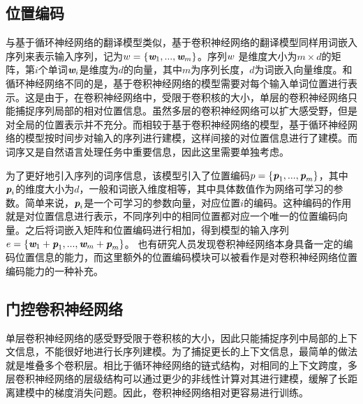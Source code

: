 
\subsection{位置编码}
\label{sec:11.2.1}

\parinterval 与基于循环神经网络的翻译模型类似，基于卷积神经网络的翻译模型同样用词嵌入序列来表示输入序列，记为${w}=\{\textbf{\em w}_1,...,\textbf{\em w}_m\}$。序列${w}$ 是维度大小为$m \times d$的矩阵，第$i$个单词$\textbf{\em w}_i$是维度为$d$的向量，其中$m$为序列长度，$d$为词嵌入向量维度。和循环神经网络不同的是，基于卷积神经网络的模型需要对每个输入单词位置进行表示。这是由于，在卷积神经网络中，受限于卷积核的大小，单层的卷积神经网络只能捕捉序列局部的相对位置信息。虽然多层的卷积神经网络可以扩大感受野，但是对全局的位置表示并不充分。而相较于基于卷积神经网络的模型，基于循环神经网络的模型按时间步对输入的序列进行建模，这样间接的对位置信息进行了建模。而词序又是自然语言处理任务中重要信息，因此这里需要单独考虑。

\parinterval 为了更好地引入序列的词序信息，该模型引入了位置编码${p}=\{\textbf{\em p}_1,...,\textbf{\em p}_m\}$，其中$\textbf{\em p}_i$的维度大小为$d$，一般和词嵌入维度相等，其中具体数值作为网络可学习的参数。简单来说，$\textbf{\em p}_i$是一个可学习的参数向量，对应位置$i$的编码。这种编码的作用就是对位置信息进行表示，不同序列中的相同位置都对应一个唯一的位置编码向量。之后将词嵌入矩阵和位置编码进行相加，得到模型的输入序列${e}=\{\textbf{\em w}_1+\textbf{\em p}_1,...,\textbf{\em w}_m+\textbf{\em p}_m\}$。 也有研究人员发现卷积神经网络本身具备一定的编码位置信息的能力，而这里额外的位置编码模块可以被看作是对卷积神经网络位置编码能力的一种补充。


\subsection{门控卷积神经网络}

\parinterval 单层卷积神经网络的感受野受限于卷积核的大小，因此只能捕捉序列中局部的上下文信息，不能很好地进行长序列建模。为了捕捉更长的上下文信息，最简单的做法就是堆叠多个卷积层。相比于循环神经网络的链式结构，对相同的上下文跨度，多层卷积神经网络的层级结构可以通过更少的非线性计算对其进行建模，缓解了长距离建模中的梯度消失问题。因此，卷积神经网络相对更容易进行训练。

